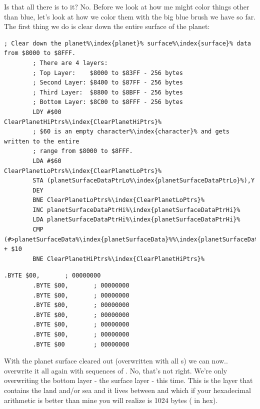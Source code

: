 Is that all there is to it? No. Before we look at how me might color things other than blue, let's look at how we color them
with the big blue brush we have so far. The first thing we do is clear down the entire surface of the planet:

\begin{lstlisting}[escapechar=\%,caption=The surface\index{surface} data is stored from \icode{\$8000} to \icode{\$8FFF}. This code overwrites it all with 
the value \$60\, which is an empty bitmap.]
        ; Clear down the planet%\index{planet}% surface%\index{surface}% data from $8000 to $8FFF.
        ; There are 4 layers:
        ; Top Layer:    $8000 to $83FF - 256 bytes 
        ; Second Layer: $8400 to $87FF - 256 bytes 
        ; Third Layer:  $8800 to $8BFF - 256 bytes 
        ; Bottom Layer: $8C00 to $8FFF - 256 bytes 
        LDY #$00
ClearPlanetHiPtrs%\index{ClearPlanetHiPtrs}%   
        ; $60 is an empty character%\index{character}% and gets written to the entire
        ; range from $8000 to $8FFF.
        LDA #$60
ClearPlanetLoPtrs%\index{ClearPlanetLoPtrs}%   
        STA (planetSurfaceDataPtrLo%\index{planetSurfaceDataPtrLo}%),Y
        DEY
        BNE ClearPlanetLoPtrs%\index{ClearPlanetLoPtrs}%
        INC planetSurfaceDataPtrHi%\index{planetSurfaceDataPtrHi}%
        LDA planetSurfaceDataPtrHi%\index{planetSurfaceDataPtrHi}%
        CMP (#>planetSurfaceData%\index{planetSurfaceData}%%\index{planetSurfaceData%\index{planetSurfaceData}%}%) + $10
        BNE ClearPlanetHiPtrs%\index{ClearPlanetHiPtrs}%
\end{lstlisting}

\begin{lstlisting}[caption=The empty character\index{character} bit map (all zeroes) used to overwrite the surface\index{surface} before populating it.,escapechar=\%]
        .BYTE $00,       ; 00000000           
        .BYTE $00,       ; 00000000           
        .BYTE $00,       ; 00000000           
        .BYTE $00,       ; 00000000           
        .BYTE $00,       ; 00000000           
        .BYTE $00,       ; 00000000           
        .BYTE $00,       ; 00000000           
        .BYTE $00        ; 00000000           
\end{lstlisting}

With the planet surface cleared out (overwritten with all s) we can now.. overwrite it all again with sequences of
. No, that's not right. We're only overwriting the bottom layer - the surface layer - this time. This is the
layer that contains the land and/or sea and it lives between  and  which if your hexadecimal
arithmetic is better than mine you will realize is 1024 bytes ( in hex).

